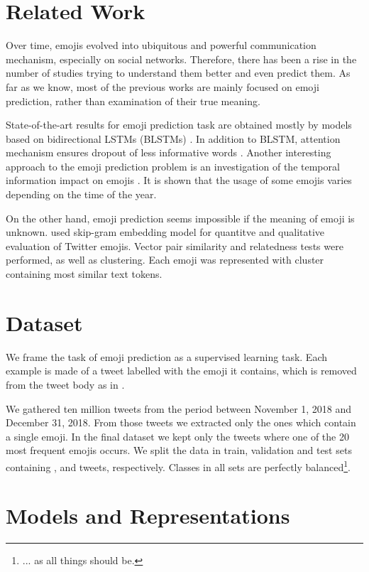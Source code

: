 \documentclass[10pt, a4paper]{article}
\begin{document}
\section{Related Work}
Over time, emojis evolved into ubiquitous and powerful communication mechanism, especially on social networks. Therefore, there has been a rise in the number of studies trying to understand them better and even predict them. As far as we know, most of the previous works are mainly focused on emoji prediction, rather than examination of their true meaning. 

State-of-the-art results for emoji prediction task are obtained mostly by models based on bidirectional LSTMs (BLSTMs) \citep{barbieri2017}. In addition to BLSTM, attention mechanism ensures dropout of less informative words \citep{millions}. Another interesting approach to the emoji prediction problem is an investigation of the temporal information impact on emojis \citep{temporal}. It is shown that the usage of some emojis varies depending on the time of the year.

On the other hand, emoji prediction seems impossible if the meaning of emoji is unknown. \citet{mean} used skip-gram embedding model for quantitve and qualitative evaluation of Twitter emojis. Vector pair similarity and relatedness tests were performed, as well as clustering. Each emoji was represented with cluster containing most similar text tokens.

\section{Dataset}

We frame the task of emoji prediction as a supervised learning task. Each 
example is made of a tweet labelled with the emoji it contains, which is removed 
from the tweet body as in \citep{barbieri2017emojis}. 

We gathered ten million tweets from the period between November 1, 2018 and 
December 31, 2018. From those tweets we extracted only the ones which contain a 
single emoji. In the final dataset we kept only the tweets where one of the 20 
most frequent emojis occurs. We split the data in train, validation and test 
sets containing ,  and  tweets,
respectively. Classes in all sets are perfectly balanced\footnote{... as all 
things should be.}.

\section{Models and Representations}
\label{sec:models}
\end{document}
